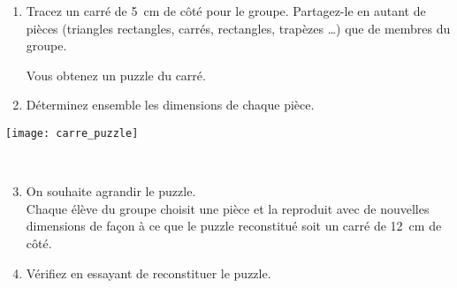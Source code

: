 
\begin{TP}

\begin{minipage}[c]{0.48\linewidth}
\begin{enumerate}
 \item Tracez un carré de 5 cm de côté pour le groupe. Partagez-le en autant de pièces (triangles rectangles, carrés, rectangles, trapèzes \ldots) que de membres du groupe.
 
Vous obtenez un puzzle du carré.
 \item Déterminez ensemble les dimensions de chaque pièce.
 \end{enumerate}
\end{minipage} \hfill%
 \begin{minipage}[c]{0.4\linewidth}
\texttt{[image: carre\_puzzle]}
 \end{minipage} \\

\begin{enumerate}
 \setcounter{enumi}{2}
 \item On souhaite agrandir le puzzle. \\[0.5em]
Chaque élève du groupe choisit une pièce et la reproduit avec de nouvelles dimensions de façon à ce que le puzzle reconstitué soit un carré de 12 cm de côté.
 \end{enumerate}

\begin{enumerate}
 \setcounter{enumi}{3}
 \item Vérifiez en essayant de reconstituer le puzzle.
 \end{enumerate}

\end{TP}

\vfill
